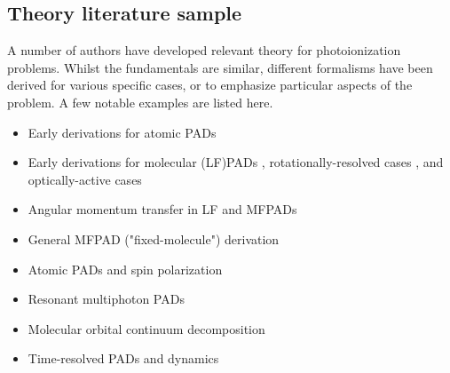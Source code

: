 \subsection{Theory literature sample\label{sec:theory-lit}}

A number of authors have developed relevant theory for photoionization problems. Whilst the fundamentals are similar, different formalisms have been derived for various specific cases, or to emphasize particular aspects of the problem. A few notable examples are listed here.

\begin{itemize}
\item Early derivations for atomic PADs \cite{Cherepkov1979,Cooper1968,Cooper1969}
\item Early derivations for molecular (LF)PADs \cite{Tully1968}, rotationally-resolved cases \cite{Buckingham1970}, and optically-active cases \cite{Ritchie1976}
\item Angular momentum transfer in LF and MFPADs \cite{Fano1972} 
\item General MFPAD ("fixed-molecule") derivation \cite{Dill1976}
\item Atomic PADs and spin polarization \cite{Klar1982}
\item Resonant multiphoton PADs \cite{Dixit1983}
\item Molecular orbital continuum decomposition \cite{Park1996}
\item Time-resolved PADs and dynamics \cite{Underwood2000,Seideman2001,Stolow2008}
\
\end{itemize}